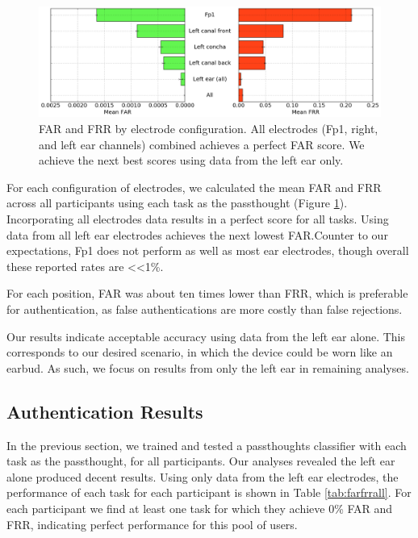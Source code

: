 \documentclass{sigchi}
\begin{document}
\begin{figure}[t]
\centering
\includegraphics[width=.9\linewidth]{./figures/mean-far-and-frr-by-electrode-config.png}
\caption{FAR and FRR by electrode configuration. All electrodes (Fp1, right, and left ear channels) combined achieves a perfect FAR score. We achieve the next best scores using data from the left ear only.}
\label{fig:meanByElectrode}
\end{figure}

For each configuration of electrodes, we calculated the mean FAR and FRR across all participants using each task as the passthought (Figure \ref{fig:meanByElectrode}). Incorporating all electrodes data results in a perfect score for all tasks. Using data from all left ear electrodes achieves the next lowest FAR.Counter to our expectations, Fp1 does not perform as well as most ear electrodes, though overall these reported rates are \textless\textless 1\%. 

For each position, FAR was about ten times lower than FRR, which is preferable for authentication, as false authentications are more costly than false rejections.

Our results indicate acceptable accuracy using data from the left ear alone. This corresponds to our desired scenario, in which the device could be worn like an earbud. As such, we focus on results from only the left ear in remaining analyses.

\subsection{Authentication Results}

In the previous section, we trained and tested a passthoughts classifier with each task as the passthought, for all participants. Our analyses revealed the left ear alone produced decent results. Using only data from the left ear electrodes, the performance of each task for each participant is shown in Table \ref{tab:farfrrall}. For each participant we find at least one task for which they achieve 0\% FAR and FRR, indicating perfect performance for this pool of users.
\end{document}
